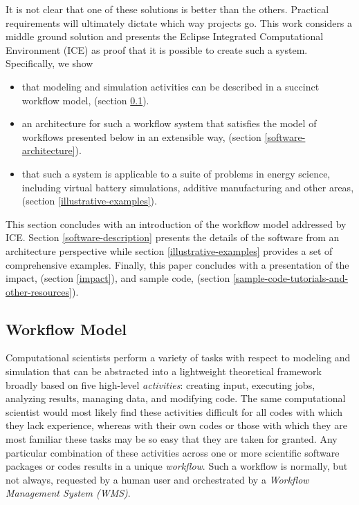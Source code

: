 It is not clear that one of these solutions is better than the others.
Practical requirements will ultimately dictate which way projects go.
This work considers a middle ground solution and presents the Eclipse
Integrated Computational Environment (ICE) as proof that it is possible
to create such a system. Specifically, we show
\begin{itemize}
  \item that modeling and simulation activities can be described in a succinct
  workflow model, (section \ref{workflow-model}).
  \item an architecture for such a workflow system that satisfies the model of
  workflows presented below in an extensible way, (section
  \ref{software-architecture}).
  \item that such a system is applicable to a suite of problems in energy
  science, including virtual battery simulations, additive manufacturing and
  other areas, (section \ref{illustrative-examples}).
\end{itemize}

This section concludes with an introduction of the workflow model addressed by
ICE. Section \ref{software-description} presents the details of the software
from an architecture perspective while section \ref{illustrative-examples}
provides a set of comprehensive examples. Finally, this paper concludes with a
presentation of the impact, (section \ref{impact}), and sample code,
(section \ref{sample-code-tutorials-and-other-resources}).

\subsection{Workflow Model}\label{workflow-model}

Computational scientists perform a variety of tasks with respect to
modeling and simulation that can be abstracted into a lightweight
theoretical framework broadly based on five high-level
\emph{activities}: creating input, executing jobs, analyzing results,
managing data, and modifying code. The same computational scientist
would most likely find these activities difficult for all codes with
which they lack experience, whereas with their own codes or those with
which they are most familiar these tasks may be so easy that they are
taken for granted. Any particular combination of these activities across
one or more scientific software packages or codes results in a unique
\emph{workflow}. Such a workflow is normally, but not always, requested
by a human user and orchestrated by a \emph{Workflow Management System
(WMS)}.

